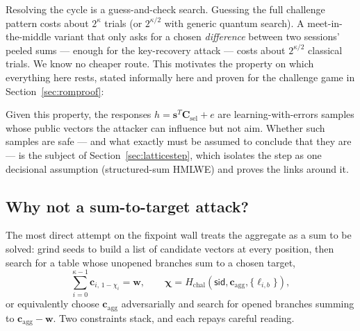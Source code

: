 \documentclass[11pt]{article}
\begin{document}
Resolving the cycle is a guess-and-check search.  Guessing the full challenge
pattern costs about $2^{\kappa}$ trials (or $2^{\kappa/2}$ with generic
quantum search).  A meet-in-the-middle variant that only asks for a chosen
\emph{difference} between two sessions' peeled sums --- enough for the
key-recovery attack --- costs about $2^{\kappa/2}$ classical trials.
We know no cheaper route.  This motivates the property on which everything
here rests, stated informally here and proven for the challenge game in
Section~\ref{sec:romproof}:

\begin{center}
\end{center}

Given this property, the responses $h=\mathbf s^{T}\mathbf
C_{\mathrm{sel}}+e$ are learning-with-errors samples whose public vectors the
attacker can influence but not aim.  Whether such samples are safe --- and
what exactly must be assumed to conclude that they are --- is the subject of
Section~\ref{sec:latticestep}, which isolates the step as one decisional
assumption (structured-sum HMLWE) and proves the links around it.

\subsection{Why not a sum-to-target attack?}
\label{sec:wagner}

The most direct attempt on the fixpoint wall treats the aggregate as a sum to
be solved: grind seeds to build a list of candidate vectors at every
position, then search for a table whose unopened branches sum to a chosen
target,
\[
 \sum_{i=0}^{\kappa-1} \mathbf c_{i,\,1-\chi_i}=\mathbf w,
 \qquad
 \boldsymbol\chi=H_{\mathrm{chal}}(\mathsf{sid},\mathbf
   c_{\mathrm{agg}},\{\ell_{i,b}\}),
\]
or equivalently choose $\mathbf c_{\mathrm{agg}}$ adversarially and search
for opened branches summing to $\mathbf c_{\mathrm{agg}}-\mathbf w$.  Two
constraints stack, and each repays careful reading.
\end{document}
